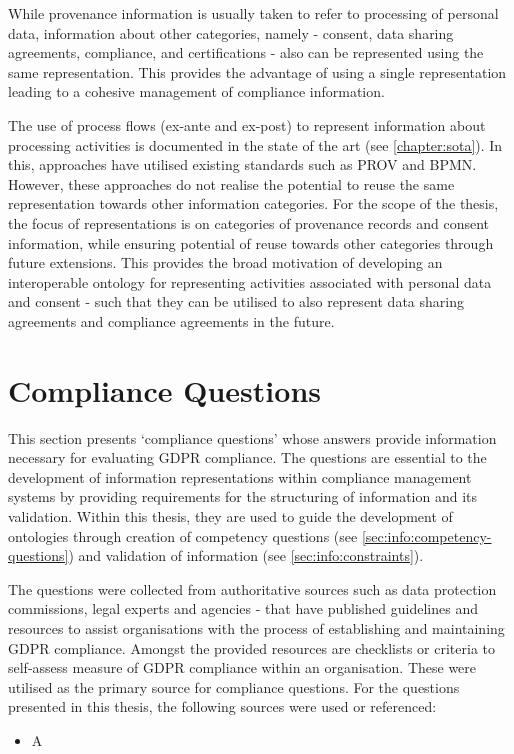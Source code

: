 While provenance information is usually taken to refer to processing of personal data, information about other categories, namely - consent, data sharing agreements, compliance, and certifications - also can be represented using the same representation. This provides the advantage of using a single representation leading to a cohesive management of compliance information.

The use of process flows (ex-ante and ex-post) to represent information about processing activities is documented in the state of the art (see \autoref{chapter:sota}). In this, approaches have utilised existing standards such as PROV and BPMN. However, these approaches do not realise the potential to reuse the same representation towards other information categories.
For the scope of the thesis, the focus of representations is on categories of provenance records and consent information, while ensuring potential of reuse towards other categories through future extensions. This provides the broad motivation of developing an interoperable ontology for representing activities associated with personal data and consent - such that they can be utilised to also represent data sharing agreements and compliance agreements in the future.

\section{Compliance Questions}\label{sec:info:compliance-questions}
This section presents `compliance questions' whose answers provide information necessary for evaluating GDPR compliance. The questions are essential to the development of information representations within compliance management systems by providing requirements for the structuring of information and its validation. Within this thesis, they are used to guide the development of ontologies through creation of competency questions (see \autoref{sec:info:competency-questions}) and validation of information (see \autoref{sec:info:constraints}).

The questions were collected from authoritative sources such as data protection commissions, legal experts and agencies - that have published guidelines and resources to assist organisations with the process of establishing and maintaining GDPR compliance.
Amongst the provided resources are checklists or criteria to self-assess measure of GDPR compliance within an organisation. These were utilised as the primary source for compliance questions.
For the questions presented in this thesis, the following sources were used or referenced:
\begin{itemize}
    \item A %
\end{itemize}

